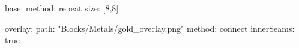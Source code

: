base:
  method: repeat
  size: [8,8]

overlay:
  path: "Blocks/Metals/gold_overlay.png"
  method: connect
  innerSeams: true